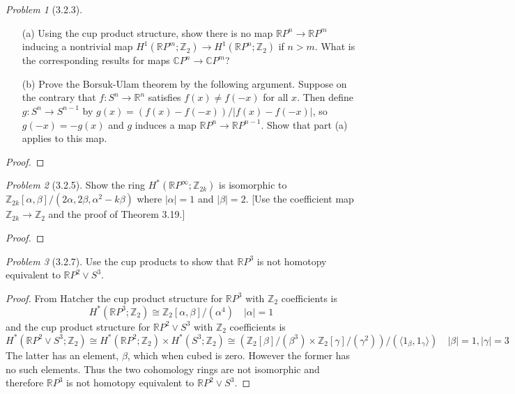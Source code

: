 \documentclass[10pt]{article}
\newcommand{\sk}{\vskip 10mm}
\newcommand{\bb}[1]{\mathbb{#1}}
\theoremstyle{remark}
\newtheorem{problem}{Problem}
\begin{document}
\begin{problem}[3.2.3]
  \begin{enumerate}
  \item[(a)] Using the cup product structure, show there is no map
    $\bb{R}P^n\rightarrow\bb{R}P^m$ inducing a nontrivial map
    $H^1(\bb{R}P^m;\bb{Z}_2)\rightarrow H^1(\bb{R}P^n;\bb{Z}_2)$ if $n>m$. What
    is the corresponding results for maps $\bb{C}P^n\rightarrow\bb{C}P^m$?
  \item[(b)] Prove the Borsuk-Ulam theorem by the following argument. Suppose on
    the contrary that $f:S^n\rightarrow \bb{R}^n$ satisfies $f(x)\neq f(-x)$ for
    all $x$. Then define $g:S^n\rightarrow S^{n-1}$ by
    $g(x)=(f(x)-f(-x))/|f(x)-f(-x)|$, so $g(-x)=-g(x)$
    and $g$ induces a map $\bb{R}P^n\rightarrow\bb{R}P^{n-1}$. Show that
    part (a) applies to this map.
  \end{enumerate}
\end{problem}

\begin{proof}
  
\end{proof}

\sk

\begin{problem}[3.2.5]
  Show the ring $H^*(\bb{R}P^\infty;\bb{Z}_{2k})$ is isomorphic to
  $\bb{Z}_{2k}[\alpha,\beta]/(2\alpha,2\beta,\alpha^2-k\beta)$ where
  $|\alpha|=1$ and $|\beta|=2$. [Use the coefficient map
  $\bb{Z}_{2k}\rightarrow\bb{Z}_2$ and the proof of Theorem 3.19.]
\end{problem}

\begin{proof}
  
\end{proof}

\sk

\begin{problem}[3.2.7]
  Use the cup products to show that $\bb{R}P^3$ is  not homotopy equivalent to
  $\bb{R}P^2\vee S^3$.
\end{problem}

\begin{proof}
  From Hatcher the cup product structure for $\bb{R}P^3$ with $\bb{Z}_2$ coefficients
  is
  \[
    H^*(\bb{R}P^3;\bb{Z}_2)\cong \bb{Z}_2[\alpha,\beta]/(\alpha^4)\quad |\alpha|=1
  \]
  and the cup product structure for $\bb{R}P^2\vee S^3$ with $\bb{Z}_2$ coefficients is
  \[
    H^*(\bb{R}P^2\vee S^3;\bb{Z}_2)\cong H^*(\bb{R}P^2;\bb{Z}_2)\times H^*(S^3;\bb{Z}_2)
    \cong(\bb{Z}_2[\beta]/(\beta^3)\times\bb{Z}_2[\gamma]/(\gamma^2))/(\langle 1_\beta,1_\gamma\rangle)\quad |\beta|=1,|\gamma|=3
  \]
  The latter has an element, $\beta$, which when cubed is zero. However the former
  has no such elements. Thus the two cohomology rings are not isomorphic
  and therefore $\bb{R}P^3$ is not homotopy equivalent to $\bb{R}P^2\vee S^3$.
\end{proof}
\end{document}
